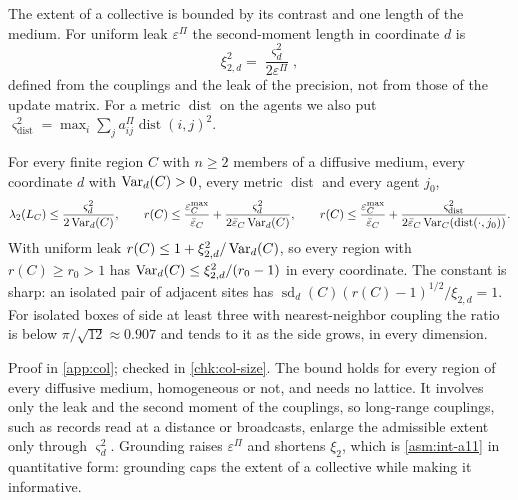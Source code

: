 The extent of a collective is bounded by its contrast and one length of the medium. For uniform leak $\varepsilon^\Pi$ the second-moment length in coordinate $d$ is
\begin{equation}\label{eq:col-xi2}
\xi_{2,d}^2=\frac{\varsigma_d^2}{2\varepsilon^\Pi},
\end{equation}
defined from the couplings and the leak of the precision, not from those of the update matrix. For a metric $\operatorname{dist}$ on the agents we also put $\varsigma_{\mathrm{dist}}^2=\max_i\sum_ja^\Pi_{ij}\operatorname{dist}(i,j)^2$.

\begin{theorem}\label{thm:col-contrast-size}
For every finite region $C$ with $n\ge2$ members of a diffusive medium, every coordinate $d$ with $\operatorname{Var}_d(C)>0$, every metric $\operatorname{dist}$ and every agent $j_0$,
\begin{equation}\label{eq:col-size}
\lambda_2(L_C)\le\frac{\varsigma_d^2}{2\operatorname{Var}_d(C)},\qquad r(C)\le\frac{\varepsilon^{\max}_C}{\bar\varepsilon_C}+\frac{\varsigma_d^2}{2\bar\varepsilon_C\operatorname{Var}_d(C)},\qquad r(C)\le\frac{\varepsilon^{\max}_C}{\bar\varepsilon_C}+\frac{\varsigma_{\mathrm{dist}}^2}{2\bar\varepsilon_C\operatorname{Var}_C(\operatorname{dist}(\cdot,j_0))}.
\end{equation}
With uniform leak $r(C)\le1+\xi_{2,d}^2/\operatorname{Var}_d(C)$, so every region with $r(C)\ge r_0>1$ has $\operatorname{Var}_d(C)\le\xi_{2,d}^2/(r_0-1)$ in every coordinate. The constant is sharp: an isolated pair of adjacent sites has $\operatorname{sd}_d(C)(r(C)-1)^{1/2}/\xi_{2,d}=1$. For isolated boxes of side at least three with nearest-neighbor coupling the ratio is below $\pi/\sqrt{12}\approx0.907$ and tends to it as the side grows, in every dimension.
\end{theorem}
Proof in \cref{app:col}; checked in \cref{chk:col-size}. The bound holds for every region of every diffusive medium, homogeneous or not, and needs no lattice. It involves only the leak and the second moment of the couplings, so long-range couplings, such as records read at a distance or broadcasts, enlarge the admissible extent only through $\varsigma_d^2$. Grounding raises $\varepsilon^\Pi$ and shortens $\xi_2$, which is \cref{asm:int-a11} in quantitative form: grounding caps the extent of a collective while making it informative.

